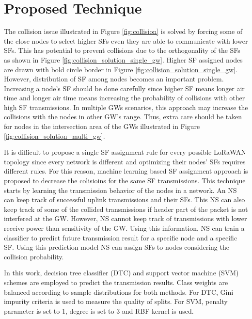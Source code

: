 \documentclass[conference]{IEEEtran}
\begin{document}
\section{Proposed Technique} \label{Proposed Technique}
\par The collision issue illustrated in Figure \ref{fig:collision} is solved by forcing some of the close nodes to select higher SFs even they are able to communicate with lower SFs. This has potential to prevent collisions due to the orthogonality of the SFs as shown in Figure \ref{fig:collision_solution_single_gw}. Higher SF assigned nodes are drawn with bold circle border in Figure \ref{fig:collision_solution_single_gw}. However, distribution of SF among nodes becomes an important problem. Increasing a node's SF should be done carefully since higher SF means longer air time and longer air time means increasing the probability of collisions with other high SF transmissions. In multiple GWs scenarios, this approach may increase the collisions with the nodes in other GW's range. Thus, extra care should be taken for nodes in the intersection area of the GWs illustrated in Figure \ref{fig:collision_solution_multi_gw}.

\par It is difficult to propose a single SF assignment rule for every possible LoRaWAN topology since every network is different and optimizing their nodes' SFs requires different rules. For this reason, machine learning based SF assignment approach is proposed to decrease the colisioins for the same SF transmissions. This technique starts by learning the transmission behavior of the nodes in a network. An NS can keep track of successful uplink transmissions and their SFs. This NS can also keep track of some of the collided transmissions if header part of the packet is not interfered at the GW. However, NS cannot keep track of transmissions with lower receive power than sensitivity of the GW. Using this information, NS can train a classifier to predict future transmission result for a specific node and a specific SF. Using this prediction model NS can assign SFs to nodes considering the collision probability.

\par In this work, decision tree classifier (DTC) and support vector machine (SVM) \cite{Alpaydin} schemes are employed to predict the transmission results. Class weights are balanced according to sample distributions for both methods. For DTC, Gini impurity criteria is used to measure the quality of splits. For SVM, penalty parameter is set to 1, degree is set to 3 and RBF kernel is used.
\end{document}
